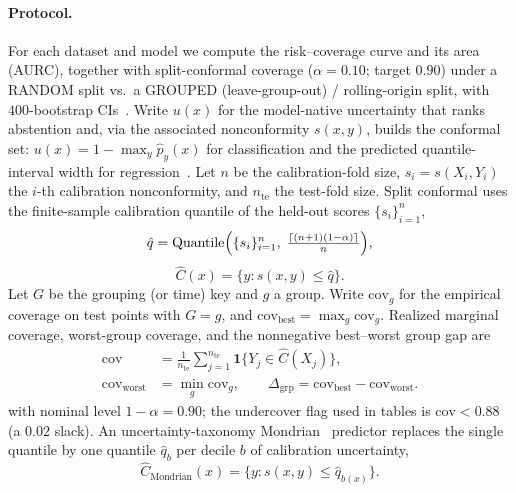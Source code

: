 \documentclass[pdflatex,sn-mathphys-num]{sn-jnl}
\begin{document}
\paragraph{Protocol.} For each dataset and model we compute the risk--coverage curve and its area (AURC), together with split-conformal coverage
($\alpha=0.10$; target $0.90$) under a RANDOM split vs.\ a GROUPED (leave-group-out) / rolling-origin split,
with $400$-bootstrap CIs~\citep{vovk2005algorithmic,angelopoulos2023conformal}.
Write $u(x)$ for the model-native uncertainty that ranks abstention and, via the associated nonconformity $s(x,y)$, builds the conformal set:
$u(x)=1-\max_y\hat p_y(x)$ for classification and the predicted quantile-interval width for regression~\citep{romano2019cqr,guo2017calibration}.
Let $n$ be the calibration-fold size, $s_i=s(X_i,Y_i)$ the $i$-th calibration nonconformity, and $n_{\mathrm{te}}$ the test-fold size.
Split conformal uses the finite-sample calibration quantile of the held-out scores $\{s_i\}_{i=1}^{n}$,
\begin{equation}
\label{eq:fs-quantile}
\hat q
=\mathrm{Quantile}\Bigl(\{s_i\}_{i=1}^{n},\;
\tfrac{\lceil(n{+}1)(1{-}\alpha)\rceil}{n}\Bigr),
\end{equation}
\begin{equation}
\label{eq:split-cp}
\hat C(x)=\bigl\{y:s(x,y)\le\hat q\bigr\}.
\end{equation}
Let $G$ be the grouping (or time) key and $g$ a group. Write $\mathrm{cov}_g$ for the empirical coverage on test points with $G=g$, and $\mathrm{cov}_{\mathrm{best}}=\max_g\mathrm{cov}_g$.
Realized marginal coverage, worst-group coverage, and the nonnegative best--worst group gap are
\begin{equation}
\label{eq:coverage}
\begin{aligned}
\mathrm{cov}
&=\frac{1}{n_{\mathrm{te}}}\sum_{j=1}^{n_{\mathrm{te}}}\mathbf{1}\bigl\{Y_j\in\hat C(X_j)\bigr\},\\
\mathrm{cov}_{\mathrm{worst}}
&=\min_g\mathrm{cov}_g,
\qquad
\Delta_{\mathrm{grp}}
=\mathrm{cov}_{\mathrm{best}}-\mathrm{cov}_{\mathrm{worst}}.
\end{aligned}
\end{equation}
with nominal level $1-\alpha=0.90$; the undercover flag used in tables is $\mathrm{cov}<0.88$ (a $0.02$ slack).
An uncertainty-taxonomy Mondrian~\citep{vovk2003mondrian} predictor replaces the single quantile by one quantile $\hat q_b$ per decile $b$ of calibration uncertainty,
\begin{equation}
\label{eq:mondrian}
\hat C_{\mathrm{Mondrian}}(x)=\bigl\{y:s(x,y)\le\hat q_{b(x)}\bigr\}.
\end{equation}
\end{document}
